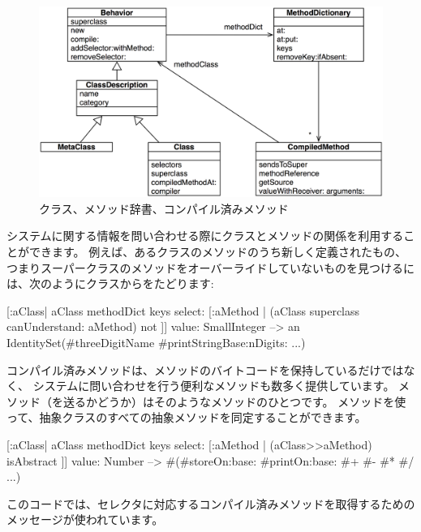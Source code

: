 \documentclass[a4paper,10pt,twoside]{book}
\begin{document}
\begin{figure}[ht]\centering
	\includegraphics[width=\linewidth]{MethodsAsObjects}
	\caption{クラス、メソッド辞書、コンパイル済みメソッド}
\end{figure}

システムに関する情報を問い合わせる際にクラスとメソッドの関係を利用することができます。
例えば、あるクラスのメソッドのうち新しく定義されたもの、つまりスーパークラスのメソッドをオーバーライドしていないものを見つけるには、次のようにクラスからをたどります:
\begin{code}{}
[:aClass| aClass methodDict keys select: [:aMethod |
  (aClass superclass canUnderstand: aMethod) not ]] value: SmallInteger
  --> an IdentitySet(#threeDigitName #printStringBase:nDigits: ...)
\end{code}

コンパイル済みメソッドは、メソッドのバイトコードを保持しているだけではなく、
システムに問い合わせを行う便利なメソッドも数多く提供しています。
メソッド（を送るかどうか）はそのようなメソッドのひとつです。
メソッドを使って、抽象クラスのすべての抽象メソッドを同定することができます。
\begin{code}{}
[:aClass| aClass methodDict keys select: [:aMethod |
  (aClass>>aMethod) isAbstract ]] value: Number
  --> #(#storeOn:base: #printOn:base: #+ #- #* #/ ...)
\end{code}
このコードでは、セレクタに対応するコンパイル済みメソッドを取得するための\ct{>>}メッセージが使われています。

\end{document}
